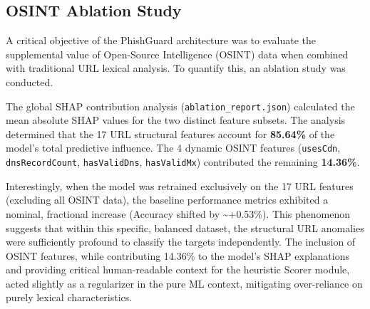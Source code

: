 \subsection{OSINT Ablation Study}\label{osint-ablation-study}

A critical objective of the PhishGuard architecture was to evaluate the
supplemental value of Open-Source Intelligence (OSINT) data when
combined with traditional URL lexical analysis. To quantify this, an
ablation study was conducted.

The global SHAP contribution analysis (\texttt{ablation\_report.json})
calculated the mean absolute SHAP values for the two distinct feature
subsets. The analysis determined that the 17 URL structural features
account for \textbf{85.64\%} of the model's total predictive influence.
The 4 dynamic OSINT features (\texttt{usesCdn}, \texttt{dnsRecordCount},
\texttt{hasValidDns}, \texttt{hasValidMx}) contributed the remaining
\textbf{14.36\%}.

Interestingly, when the model was retrained exclusively on the 17 URL
features (excluding all OSINT data), the baseline performance metrics
exhibited a nominal, fractional increase (Accuracy shifted by
\textasciitilde+0.53\%). This phenomenon suggests that within this
specific, balanced dataset, the structural URL anomalies were
sufficiently profound to classify the targets independently. The
inclusion of OSINT features, while contributing 14.36\% to the model's
SHAP explanations and providing critical human-readable context for the
heuristic Scorer module, acted slightly as a regularizer in the pure ML
context, mitigating over-reliance on purely lexical characteristics.

